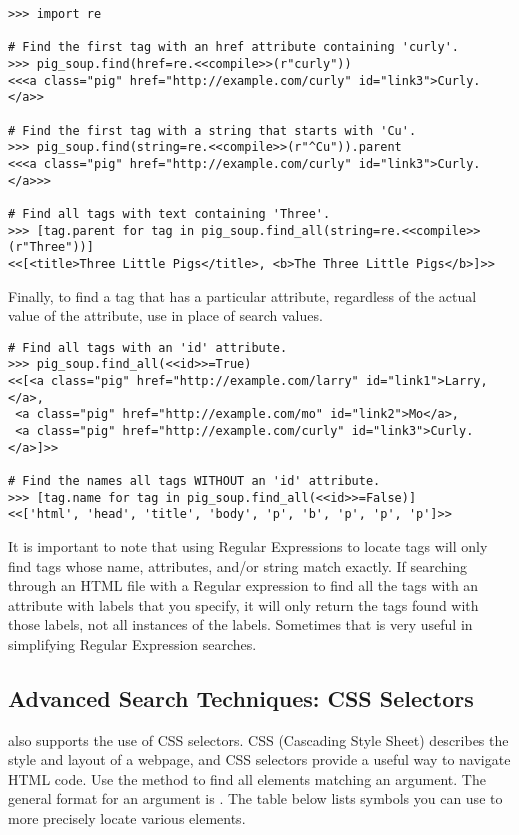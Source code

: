 \begin{lstlisting}
>>> import re

# Find the first tag with an href attribute containing 'curly'.
>>> pig_soup.find(href=re.<<compile>>(r"curly"))
<<<a class="pig" href="http://example.com/curly" id="link3">Curly.</a>>

# Find the first tag with a string that starts with 'Cu'.
>>> pig_soup.find(string=re.<<compile>>(r"^Cu")).parent
<<<a class="pig" href="http://example.com/curly" id="link3">Curly.</a>>>

# Find all tags with text containing 'Three'.
>>> [tag.parent for tag in pig_soup.find_all(string=re.<<compile>>(r"Three"))]
<<[<title>Three Little Pigs</title>, <b>The Three Little Pigs</b>]>>
\end{lstlisting}

Finally, to find a tag that has a particular attribute, regardless of the actual value of the attribute, use  in place of search values.

\begin{lstlisting}
# Find all tags with an 'id' attribute.
>>> pig_soup.find_all(<<id>>=True)
<<[<a class="pig" href="http://example.com/larry" id="link1">Larry,</a>,
 <a class="pig" href="http://example.com/mo" id="link2">Mo</a>,
 <a class="pig" href="http://example.com/curly" id="link3">Curly.</a>]>>

# Find the names all tags WITHOUT an 'id' attribute.
>>> [tag.name for tag in pig_soup.find_all(<<id>>=False)]
<<['html', 'head', 'title', 'body', 'p', 'b', 'p', 'p', 'p']>>
\end{lstlisting}
It is important to note that using Regular Expressions to locate tags  will only find tags whose name, attributes, and/or string match exactly. If searching through an HTML file with a Regular expression to find all the tags with an   attribute with labels that you specify, it will only return the tags found with those labels, not all instances of the labels. Sometimes that is very useful in simplifying Regular Expression searches.

\subsection*{Advanced Search Techniques: CSS Selectors} %

 also supports the use of CSS selectors.
CSS (Cascading Style Sheet) describes the style and layout of a webpage, and CSS selectors provide a useful way to navigate HTML code.
Use the method  to find all elements matching an argument.
The general format for an argument is .
The table below lists symbols you can use to more precisely locate various elements. 

